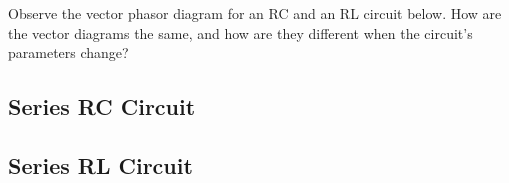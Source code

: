 \documentclass{ximera}
\begin{document}
\newpage


\begin{example}
Observe the vector phasor diagram for an RC and an RL circuit below. How are the vector diagrams the same, and how are they different when the circuit's parameters change?
\subsection{Series RC Circuit}
\begin{center}  
\end{center} 

\subsection{Series RL Circuit}
\begin{center}  
\end{center}
\end{example}
\end{document}
